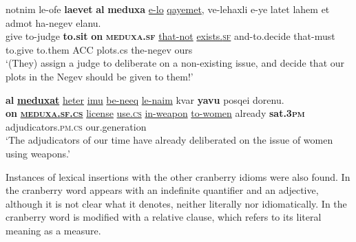 \documentclass[output=paper]{langsci/langscibook}
\begin{document}
        \ea\label{meduxa-rc-insertion}
            \gll notnim le-{\shin}ofe{\tet} \textbf{la{\shin}evet} \textbf{{\ayin}al} \textbf{meduxa} \underline{{\shin}e-lo} \underline{qayemet}, ve-lehaxli{\tet} {\shin}e-ye{\shin} latet lahem {\alef}et {\alef}admot ha-negev {\shin}elanu.\\
                give to-judge \textbf{to.sit} \textbf{on} \textbf{\textsc{meduxa}.\textsc{sf}} \underline{that-not} \underline{exists.\textsc{sf}} and-to.decide that-must to.give to.them ACC plots.cs the-negev ours\\
            \glt `(They) assign a judge to deliberate on a non-existing issue, and decide that our plots in the Negev should be given to them!'
        \z

    \ea\label{meduxa-cs-insertion}
        \gll \textbf{{\ayin}al} \textbf{\underline{meduxat}} \underline{heter} \underline{{\shin}imu{\shin}} \underline{be-ne{\shin}eq} \underline{le-na{\shin}im} kvar \textbf{ya{\shin}vu} posqei dorenu.\\
            \textbf{on} \textbf{\underline{\textsc{meduxa}.\textsc{sf}.\textsc{cs}}} \underline{license} \underline{use.\textsc{cs}} \underline{in-weapon} \underline{to-women} already \textbf{sat.\textsc{3pm}} adjudicators.\textsc{pm}.\textsc{cs} our.generation \\
        \glt `The adjudicators of our time have already deliberated on the issue of women using weapons.'
    \z

Instances of lexical insertions with the other cranberry idioms were also found. In  the cranberry word  appears with an indefinite quantifier and an adjective, although it is not clear what it denotes, neither literally nor idiomatically. In  the cranberry word  is modified with a relative clause, which refers to its literal meaning as a measure.
\end{document}
